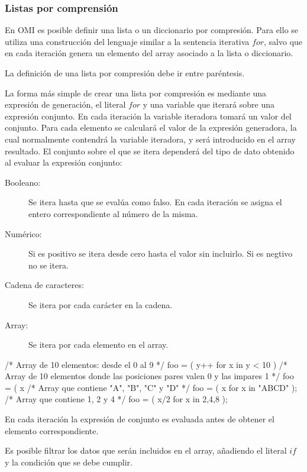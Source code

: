 \subsubsection{Listas por comprensión}
En OMI es posible definir una lista o un diccionario por compresión. Para ello se utiliza una construcción del
lenguaje similar a la sentencia iterativa $for$, salvo que en cada iteración genera un elemento del array 
asociado a la lista o diccionario. 

La definición de una lista por compresión debe ir entre paréntesis.

La forma más simple de crear una lista por compresión es mediante una expresión de generación, 
el literal $for$ y una variable que iterará sobre una expresión conjunto. En cada iteración la variable 
iteradora tomará un valor del conjunto. Para cada elemento se calculará el valor de 
la expresión generadora, la cual normalmente contendrá la variable iteradora, y será introducido en 
el array resultado. El conjunto sobre el que se itera dependerá del tipo de dato obtenido al evaluar la expresión conjunto:

\begin {description}
\item [Booleano:] Se itera hasta que se evalúa como falso. En cada iteración se asigna el entero correspondiente al número de la misma.
\item [Numérico:] Si es positivo se itera desde cero hasta el valor sin incluirlo. Si es negtivo no se itera.
\item [Cadena de caracteres:] Se itera por cada carácter en la cadena.
\item [Array:] Se itera por cada elemento en el array.
\end{description}

\begin{myverbatim}
   /*
      Array de 10 elementos: desde el 0 al 9
   */
    foo = ( y++ for x in y < 10 )
   /*
      Array de 10 elementos donde las 
      posiciones pares valen 0 y las
      impares 1
   */
   foo = ( x %
   /*
      Array que contiene "A", "B", "C" y "D"
   */
   foo = ( x for x in "ABCD" ); 
   /*
      Array que contiene 1, 2 y 4
   */
   foo = ( x/2 for x in {2,4,8} ); 
\end{myverbatim}



En cada iteración la expresión de conjunto es evaluada antes de obtener el elemento correspondiente.

Es posible filtrar los datos que serán incluidos en el array, añadiendo el literal
$if$ y la condición que se debe cumplir. \\

